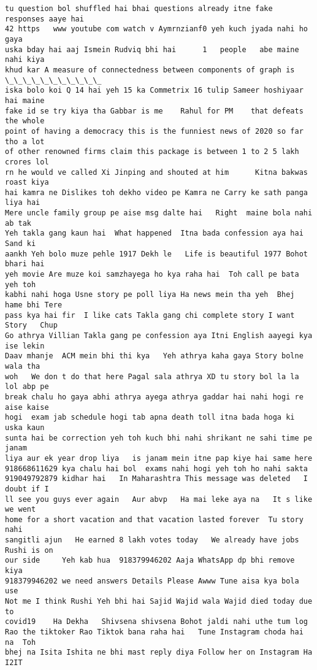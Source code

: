\documentclass[11pt]{article}
\begin{document}
\begin{tcolorbox}[breakable, size=fbox, boxrule=.5pt, pad at break*=1mm, opacityfill=0]
\begin{Verbatim}[commandchars=\\\{\}]
tu question bol shuffled hai bhai questions already itne fake responses aaye hai
42 https   www youtube com watch v Aymrnzianf0 yeh kuch jyada nahi ho gaya
uska bday hai aaj Ismein Rudviq bhi hai      1   people   abe maine nahi kiya
khud kar A measure of connectedness between components of graph is \_\_\_\_\_\_\_\_\_\_\_
iska bolo koi Q 14 hai yeh 15 ka Commetrix 16 tulip Sameer hoshiyaar hai maine
fake id se try kiya tha Gabbar is me    Rahul for PM    that defeats the whole
point of having a democracy this is the funniest news of 2020 so far tho a lot
of other renowned firms claim this package is between 1 to 2 5 lakh crores lol
rn he would ve called Xi Jinping and shouted at him      Kitna bakwas roast kiya
hai kamra ne Dislikes toh dekho video pe Kamra ne Carry ke sath panga liya hai
Mere uncle family group pe aise msg dalte hai   Right  maine bola nahi ab tak
Yeh takla gang kaun hai  What happened  Itna bada confession aya hai     Sand ki
aankh Yeh bolo muze pehle 1917 Dekh le   Life is beautiful 1977 Bohot bhari hai
yeh movie Are muze koi samzhayega ho kya raha hai  Toh call pe bata   yeh toh
kabhi nahi hoga Usne story pe poll liya Ha news mein tha yeh  Bhej hame bhi Tere
pass kya hai fir  I like cats Takla gang chi complete story I want Story   Chup
Go athrya Villian Takla gang pe confession aya Itni English aayegi kya ise lekin
Daav mhanje  ACM mein bhi thi kya   Yeh athrya kaha gaya Story bolne wala tha
woh   We don t do that here Pagal sala athrya XD tu story bol la la lol abp pe
break chalu ho gaya abhi athrya ayega athrya gaddar hai nahi hogi re aise kaise
hogi  exam jab schedule hogi tab apna death toll itna bada hoga ki uska kaun
sunta hai be correction yeh toh kuch bhi nahi shrikant ne sahi time pe janam
liya aur ek year drop liya   is janam mein itne pap kiye hai same here
918668611629 kya chalu hai bol  exams nahi hogi yeh toh ho nahi sakta
919049792879 kidhar hai   In Maharashtra This message was deleted   I doubt if I
ll see you guys ever again   Aur abvp   Ha mai leke aya na   It s like we went
home for a short vacation and that vacation lasted forever  Tu story nahi
sangitli ajun   He earned 8 lakh votes today   We already have jobs Rushi is on
our side     Yeh kab hua  918379946202 Aaja WhatsApp dp bhi remove kiya
918379946202 we need answers Details Please Awww Tune aisa kya bola use
Not me I think Rushi Yeh bhi hai Sajid Wajid wala Wajid died today due to
covid19    Ha Dekha   Shivsena shivsena Bohot jaldi nahi uthe tum log
Rao the tiktoker Rao Tiktok bana raha hai   Tune Instagram choda hai na  Toh
bhej na Isita Ishita ne bhi mast reply diya Follow her on Instagram Ha I2IT

\end{Verbatim}
\end{tcolorbox}
\end{document}

